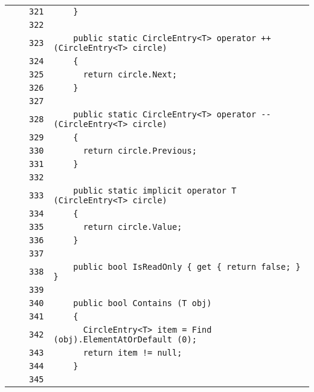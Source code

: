 \documentclass[a4paper,10pt]{article}
\begin{document}
\begin{longtable}[l]{lrrl}
\cellcolor{gray} &  & \verb~321~ & \verb~    }~\\
\cellcolor{gray} &  & \verb~322~ & \verb~~\\
\cellcolor{gray} &  & \verb~323~ & \verb~    public static CircleEntry<T> operator ++ (CircleEntry<T> circle)~\\
\cellcolor{gray} &  & \verb~324~ & \verb~    {~\\
\cellcolor{gray} &  & \verb~325~ & \verb~      return circle.Next;~\\
\cellcolor{gray} &  & \verb~326~ & \verb~    }~\\
\cellcolor{gray} &  & \verb~327~ & \verb~~\\
\cellcolor{gray} &  & \verb~328~ & \verb~    public static CircleEntry<T> operator -- (CircleEntry<T> circle)~\\
\cellcolor{gray} &  & \verb~329~ & \verb~    {~\\
\cellcolor{gray} &  & \verb~330~ & \verb~      return circle.Previous;~\\
\cellcolor{gray} &  & \verb~331~ & \verb~    }~\\
\cellcolor{gray} &  & \verb~332~ & \verb~~\\
\cellcolor{gray} &  & \verb~333~ & \verb~    public static implicit operator T (CircleEntry<T> circle)~\\
\cellcolor{gray} &  & \verb~334~ & \verb~    {~\\
\cellcolor{gray} &  & \verb~335~ & \verb~      return circle.Value;~\\
\cellcolor{gray} &  & \verb~336~ & \verb~    }~\\
\cellcolor{gray} &  & \verb~337~ & \verb~~\\
\cellcolor{gray} &  & \verb~338~ & \verb~    public bool IsReadOnly { get { return false; } }~\\
\cellcolor{gray} &  & \verb~339~ & \verb~~\\
\cellcolor{gray} &  & \verb~340~ & \verb~    public bool Contains (T obj)~\\
\cellcolor{gray} &  & \verb~341~ & \verb~    {~\\
\cellcolor{gray} &  & \verb~342~ & \verb~      CircleEntry<T> item = Find (obj).ElementAtOrDefault (0);~\\
\cellcolor{gray} &  & \verb~343~ & \verb~      return item != null;~\\
\cellcolor{gray} &  & \verb~344~ & \verb~    }~\\
\cellcolor{gray} &  & \verb~345~ & \verb~~\\

\end{longtable}
\end{document}
